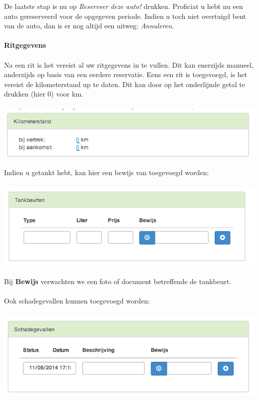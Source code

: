 \documentclass[11pt,a4paper,oneside]{article}
\begin{document}
De laatste stap is nu op \textit{Reserveer deze auto!}  drukken. Proficiat u hebt nu een auto gereserveerd voor de opgegeven periode. Indien u toch niet overtuigd bent van de auto, dan is er nog altijd een uitweg: \textit{Annuleren}. \\\\
{\large{\textbf{Ritgegevens}}} \\\\
Na een rit is het vereist al uw ritgegevens in te vullen. Dit kan enerzijds manueel, anderzijds op basis van een eerdere reservatie. Eens een rit is toegevoegd, is het vereist de kilometerstand up te daten. Dit kan door op het onderlijnde getal te drukken (hier 0) voor km. \\\\
\includegraphics[scale=0.75]{img/kilometerstand}

Indien u getankt hebt, kan hier een bewijs van toegevoegd worden: \\\\
\includegraphics[scale=0.75]{img/tank} \\\\
Bij \textbf{Bewijs} verwachten we een foto of document betreffende de tankbeurt. 
\\\\
Ook schadegevallen kunnen toegevoegd worden: \\\\
\includegraphics[scale=0.75]{img/schadegevallen} \\\\
\end{document}
